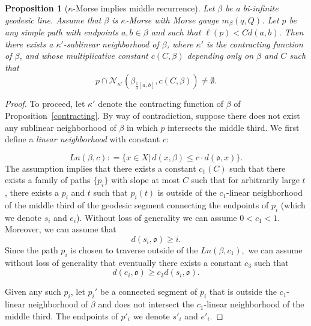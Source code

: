 \documentclass[12 pt]{amsart}
\newcommand{\gothic}{\mathfrak}
\newcommand{\go}{{\gothic o}}
\newtheorem{proposition}[theorem]{Proposition}
\theoremstyle{definition}
\theoremstyle{remark}
\begin{document}
\begin{proposition}[$\kappa$-Morse implies middle recurrence] \label{prop3.5}
Let $\beta$ be a bi-infinite geodesic line. Assume that  $\beta$ is $\kappa$-Morse with Morse gauge $m_\beta(q, Q)$. Let $p$ be any simple path with endpoints $a, b \in \beta$ and such that $\ell(p) < C d(a, b)$. Then there exists a $\kappa'$-sublinear neighborhood of $\beta$, where $\kappa'$ is the contracting function of $\beta$, and whose multiplicative constant $c(C, \beta)$ depending only on $\beta$ and $C$ such that 
\[ p \cap \mathcal{N}_{\kappa'} (\beta_{\frac 13[a,b]}, c(C, \beta)) \neq \emptyset.\]

\end{proposition}
\begin{proof}
    To proceed, let 
    $\kappa'$ denote the contracting function of $\beta$ of Proposition~\ref{contracting}. By way of contradiction, suppose there does not exist any sublinear neighborhood of $\beta$ in which $p$ intersects the middle third. We first define a \emph{linear neighborhood} with constant $c$:
     
  \[Ln(\beta, c) : = \{ x \in X | \, d(x, \beta) \leq c \cdot d(\go, x)\}.\]
  The assumption implies that there exists a constant $c_1(C)$ such that there exists a family of paths $\{p_i \}$ with slope at most $C$ such that for arbitrarily large $t$, there exists a $p_i$ and $t$ such that  $p_i(t)$ is outside of the $c_1$-linear neighborhood of the middle third of the geodesic segment connecting the endpoints of $p_i$ (which we denote $s_i$ and $e_i$). Without loss of generality we can assume $0<c_1 <1.$ Moreover, we can assume that 
  \[d(s_i, \go) \geq i.\]
  Since the path $p_i$ is chosen to traverse outside of the $Ln(\beta, c_1),$ we can assume without loss of generality that eventually there exists a constant $c_3$ such that 
  \[
  d(e_i, \go) \geq c_3 d(s_i, \go).
  \]
  
  
  Given any such $p_i$, let $p_i'$ be a connected segment of $p_i$ that is outside the $c_1$-linear neighborhood of $\beta$ and does not intersect the $c_1$-linear neighborhood of the middle third. The endpoints of $p'_i$ we denote $s'_i$ and $e'_i$.
  

\end{proof}
\end{document}

